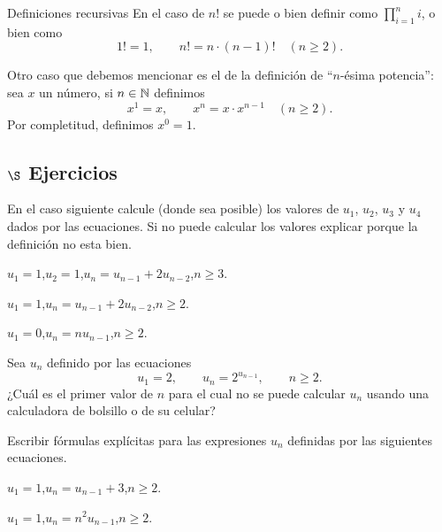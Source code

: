 \begin{section}{Definiciones recursivas}
En  el caso de $n!$ se puede  o bien definir como $\prod_{i=1}^{n} i$, o bien como
$$
1!=1,\qquad n!=n \cdot (n-1)! \quad (n\ge 2).
$$

Otro caso que debemos mencionar es  el de la definición de ``$n$-ésima potencia'': sea $x$ un  número, si $n \in {\mathbb N}$ definimos
$$
x^1=x,\qquad x^n= x \cdot x^{n-1} \quad (n\ge 2).
$$
Por completitud,  definimos $x^0=1$. 

\subsection*{$\S$ Ejercicios}
\begin{enumex}
    \item En el caso siguiente calcule (donde sea posible) los valores de $u_1$, $u_2$, $u_3$ y $u_4$ dados por las ecuaciones. Si no puede calcular los valores explicar porque la definición no esta bien.
    \begin{enumex}
        \item $u_1 = 1$,\qquad $u_2=1$,\qquad $u_n = u_{n-1} +2 u_{n-2}$,\qquad $n \ge 3$. 
        \item $u_1 = 1$,\qquad $u_n = u_{n-1} +2u_{n-2}$,\qquad $n \ge 2$. 
        \item $u_1 = 0$,\qquad $u_n = nu_{n-1}$,\qquad $n \ge 2$.
    \end{enumex}

    \item Sea $u_n$ definido por las ecuaciones
    $$
    u_1=2,\qquad u_n= 2^{u_{n-1}}, \qquad n\ge 2.
    $$
    ¿Cuál es el primer valor de $n$ para el cual no se puede calcular $u_n$ usando una calculadora de bolsillo o de su celular?

    \item Escribir fórmulas explícitas para las expresiones $u_n$ definidas por las siguientes ecuaciones.
    \begin{enumex}
        \item $u_1 = 1$,\qquad $u_n = u_{n-1} +3$,\qquad $n \ge 2$. 
        \item $u_1 = 1$,\qquad $u_n = n^2u_{n-1}$,\qquad $n \ge 2$.
    \end{enumex}
\end{enumex}
\end{section}


